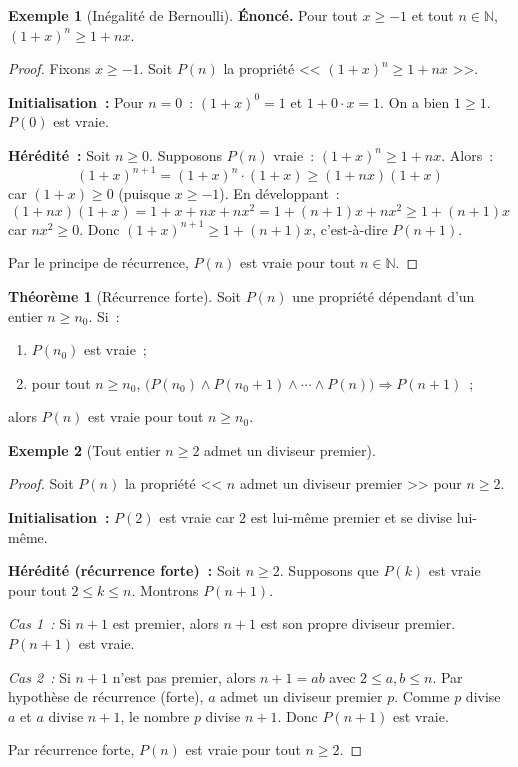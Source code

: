 \documentclass[12pt,a4paper,openany]{book}
\theoremstyle{definition}
\newtheorem{theoreme}{Théorème}[chapter]
\newtheorem{exemple}{Exemple}[chapter]
\newcommand{\N}{\mathbb{N}}
\begin{document}
\begin{exemple}[Inégalité de Bernoulli]\label{ex:bernoulli}
  \textbf{Énoncé.} Pour tout $x \geq -1$ et tout $n \in \N$, $(1+x)^n \geq 1 + nx$.

  \begin{proof}
    Fixons $x \geq -1$. Soit $P(n)$ la propriété << $(1+x)^n \geq 1+nx$ >>.

    \textbf{Initialisation~:} Pour $n = 0$~: $(1+x)^0 = 1$ et $1 + 0 \cdot x = 1$. On a bien $1 \geq 1$. $P(0)$ est vraie.

    \textbf{Hérédité~:} Soit $n \geq 0$. Supposons $P(n)$ vraie~: $(1+x)^n \geq 1+nx$. Alors~:
    \[
      (1+x)^{n+1} = (1+x)^n \cdot (1+x) \geq (1+nx)(1+x)
    \]
    car $(1+x) \geq 0$ (puisque $x \geq -1$). En développant~:
    \[
      (1+nx)(1+x) = 1 + x + nx + nx^2 = 1 + (n+1)x + nx^2 \geq 1 + (n+1)x
    \]
    car $nx^2 \geq 0$. Donc $(1+x)^{n+1} \geq 1 + (n+1)x$, c'est-à-dire $P(n+1)$.

    Par le principe de récurrence, $P(n)$ est vraie pour tout $n \in \N$.
  \end{proof}
\end{exemple}

\begin{theoreme}[Récurrence forte]\label{thm:recurrence-forte}
  Soit $P(n)$ une propriété dépendant d'un entier $n \geq n_0$. Si~:
  \begin{enumerate}[label=(\roman*)]
    \item $P(n_0)$ est vraie~;
    \item pour tout $n \geq n_0$, $\bigl(P(n_0) \land P(n_0+1) \land \cdots \land P(n)\bigr) \Rightarrow P(n+1)$~;
  \end{enumerate}
  alors $P(n)$ est vraie pour tout $n \geq n_0$.
\end{theoreme}

\begin{exemple}[Tout entier $n \geq 2$ admet un diviseur premier]\label{ex:diviseur-premier}
  \begin{proof}
    Soit $P(n)$ la propriété << $n$ admet un diviseur premier >> pour $n \geq 2$.

    \textbf{Initialisation~:} $P(2)$ est vraie car $2$ est lui-même premier et se divise lui-même.

    \textbf{Hérédité (récurrence forte)~:} Soit $n \geq 2$. Supposons que $P(k)$ est vraie pour tout $2 \leq k \leq n$. Montrons $P(n+1)$.

    \emph{Cas 1~:} Si $n+1$ est premier, alors $n+1$ est son propre diviseur premier. $P(n+1)$ est vraie.

    \emph{Cas 2~:} Si $n+1$ n'est pas premier, alors $n+1 = ab$ avec $2 \leq a, b \leq n$. Par hypothèse de récurrence (forte), $a$ admet un diviseur premier $p$. Comme $p$ divise $a$ et $a$ divise $n+1$, le nombre $p$ divise $n+1$. Donc $P(n+1)$ est vraie.

    Par récurrence forte, $P(n)$ est vraie pour tout $n \geq 2$.
  \end{proof}
\end{exemple}
\end{document}
